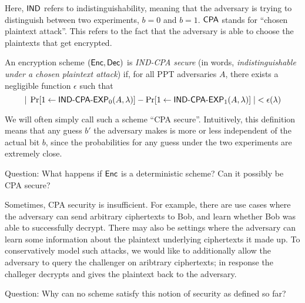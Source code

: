 Here, ${\sf IND}$ refers to indistinguishability, meaning that the adversary is trying to distinguish between two experiments, $b=0$ and $b=1$.  ${\sf CPA}$ stands for ``chosen plaintext attack''.  This refers to the fact that the adversary is able to choose the plaintexts that get encrypted.

\begin{definition} An encryption scheme $({\sf Enc},{\sf Dec})$ is \emph{{\sf IND-CPA} secure} (in words, \emph{indistinguishable under a chosen plaintext attack}) if, for all PPT adversaries $A$, there exists a negligible function $\epsilon$ such that
	\[|\;\Pr[1\gets\text{\sf IND-CPA-EXP}_0(A,\lambda)]-\Pr[1\gets\text{\sf IND-CPA-EXP}_1(A,\lambda)]\;|<\epsilon(\lambda)\]
\end{definition}

We will often simply call such a scheme ``CPA secure''.  Intuitively, this definition means that any guess $b'$ the adversary makes is more or less independent of the actual bit $b$, since the probabilities for any guess under the two experiments are extremely close.

\begin{center}Question: What happens if ${\sf Enc}$ is a deterministic scheme?  Can it possibly be CPA secure?\end{center}

\medskip

Sometimes, CPA security is insufficient.  For example, there are use cases where the adversary can send arbitrary ciphertexts to Bob, and learn whether Bob was able to successfully decrypt.  There may also be settings where the adversary can learn some information about the plaintext underlying ciphertexts it made up.  To conservatively model such attacks, we would like to additionally allow the adversary to query the challenger on aribtrary ciphertexts; in response the challeger decrypts and gives the plaintext back to the adversary.

\begin{center}Question: Why can no scheme satisfy this notion of security as defined so far?\end{center}

